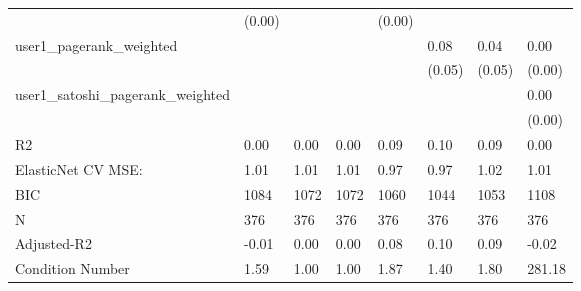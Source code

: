 \begin{table}
\begin{center}
\begin{tabular}{llllllll}
                                               & (0.00)   &            &         & (0.00)  &          &             &         \\
user1_pagerank_weighted                        &          &            &         &         & 0.08     & 0.04        & 0.00    \\
                                               &          &            &         &         & (0.05)   & (0.05)      & (0.00)  \\
user1_satoshi_pagerank_weighted                &          &            &         &         &          &             & 0.00    \\
                                               &          &            &         &         &          &             & (0.00)  \\
R2                                             & 0.00     & 0.00       & 0.00    & 0.09    & 0.10     & 0.09        & 0.00    \\
ElasticNet CV MSE:                             & 1.01     & 1.01       & 1.01    & 0.97    & 0.97     & 1.02        & 1.01    \\
BIC                                            & 1084     & 1072       & 1072    & 1060    & 1044     & 1053        & 1108    \\
N                                              & 376      & 376        & 376     & 376     & 376      & 376         & 376     \\
Adjusted-R2                                    & -0.01    & 0.00       & 0.00    & 0.08    & 0.10     & 0.09        & -0.02   \\
Condition Number                               & 1.59     & 1.00       & 1.00    & 1.87    & 1.40     & 1.80        & 281.18  \\
\hline
\end{tabular}
\end{center}
\end{table}